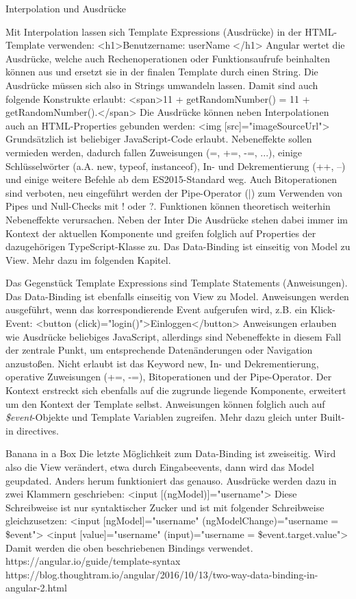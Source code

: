 Interpolation und Ausdrücke

Mit Interpolation lassen sich Template Expressions (Ausdrücke) in der HTML-Template verwenden:
<h1>Benutzername: {{ userName }}</h1>
Angular wertet die Ausdrücke, welche auch Rechenoperationen oder Funktionsaufrufe beinhalten können aus und ersetzt sie in der finalen Template durch einen String. Die Ausdrücke müssen sich also in Strings umwandeln lassen. Damit sind auch folgende Konstrukte erlaubt:
<span>11 + {{getRandomNumber()}} = {{11 + getRandomNumber()}}.</span>
Die Ausdrücke können neben Interpolationen auch an HTML-Properties gebunden werden:
<img [src]="imageSourceUrl">
Grundsätzlich ist beliebiger JavaScript-Code erlaubt. Nebeneffekte sollen vermieden werden, dadurch fallen Zuweisungen (=, +=, -=, ...), einige Schlüsselwörter (a.A. new, typeof, instanceof), In- und Dekrementierung (++, --) und einige weitere Befehle ab dem ES2015-Standard weg. Auch Bitoperationen sind verboten, neu eingeführt werden der Pipe-Operator (|) zum Verwenden von Pipes und Null-Checks mit ! oder ?. Funktionen können theoretisch weiterhin Nebeneffekte verursachen. Neben der Inter
Die Ausdrücke stehen dabei immer im Kontext der aktuellen Komponente und greifen folglich auf Properties der dazugehörigen TypeScript-Klasse zu. Das Data-Binding ist einseitig von Model zu View. Mehr dazu im folgenden Kapitel.

Das Gegenstück Template Expressions sind Template Statements (Anweisungen). Das Data-Binding ist ebenfalls einseitig von View zu Model. Anweisungen werden ausgeführt, wenn das korrespondierende Event aufgerufen wird, z.B. ein Klick-Event:
<button (click)="login()">Einloggen</button>
Anweisungen erlauben wie Ausdrücke beliebiges JavaScript, allerdings sind Nebeneffekte in diesem Fall der zentrale Punkt, um entsprechende Datenänderungen oder Navigation anzustoßen. Nicht erlaubt ist das Keyword new, In- und Dekrementierung, operative Zuweisungen (+=, -=), Bitoperationen und der Pipe-Operator.
Der Kontext erstreckt sich ebenfalls auf die zugrunde liegende Komponente, erweitert um den Kontext der Template selbst. Anweisungen können folglich auch auf \textit{\$event}-Objekte und Template Variablen zugreifen. Mehr dazu gleich unter Built-in directives.

Banana in a Box
Die letzte Möglichkeit zum Data-Binding ist zweiseitig. Wird also die View verändert, etwa durch Eingabeevents, dann wird das Model geupdated. Anders herum funktioniert das genauso. Ausdrücke werden dazu in zwei Klammern geschrieben:
<input [(ngModel)]="username">
Diese Schreibweise ist nur syntaktischer Zucker und ist mit folgender Schreibweise gleichzusetzen:
<input [ngModel]="username" (ngModelChange)="username = \$event">
<input [value]="username" (input)="username = \$event.target.value">
Damit werden die oben beschriebenen Bindings verwendet.
https://angular.io/guide/template-syntax
https://blog.thoughtram.io/angular/2016/10/13/two-way-data-binding-in-angular-2.html

